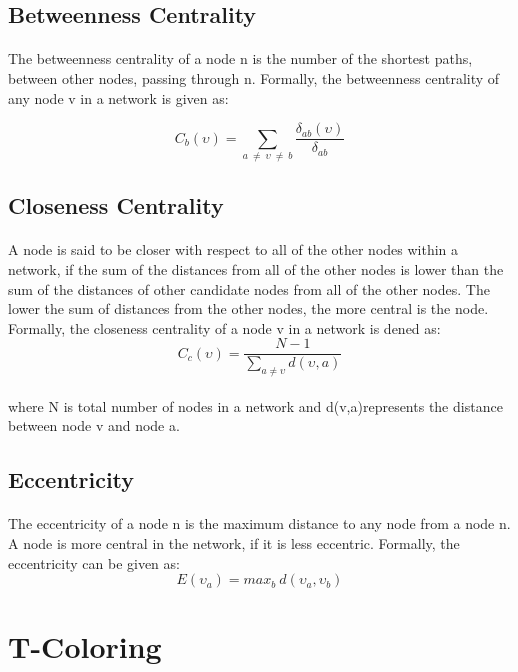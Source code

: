 \subsection{Betweenness Centrality} 
\paragraph{}
The betweenness centrality of a node n is the number of the shortest paths, between
other nodes, passing through n. Formally, the betweenness centrality of any node v in a
network is given as:

\[
C_{b}(\upsilon) = \sum_{ a \ \neq \  \upsilon \ \neq \ b} \frac{\delta_{ab}(\upsilon)}{\delta_{ab}}
\] 

\subsection{Closeness Centrality}
\paragraph{}
A node is said to be closer with respect to all of the other nodes within a network, if
the sum of the distances from all of the other nodes is lower than the sum of the distances
of other candidate nodes from all of the other nodes. The lower the sum of distances from
the other nodes, the more central is the node. Formally, the closeness centrality of a node
v in a network is dened as:
\linebreak
\[
C_{c}(\upsilon) = \frac{N - 1}{ \sum _{ a \neq \upsilon} d(\upsilon, a)}
\]

\paragraph{}
where N is total number of nodes in a network and d(v,a)represents the distance between
node v and node a.
\subsection{Eccentricity}
\paragraph{}
The eccentricity of a node n is the maximum distance to any node from a node n. A
node is more central in the network, if it is less eccentric. Formally, the eccentricity can be
given as:
$$ E(\upsilon_{a}) = max _{b} \ d(\upsilon_{a},\upsilon_{b}) $$
\section{T-Coloring}

